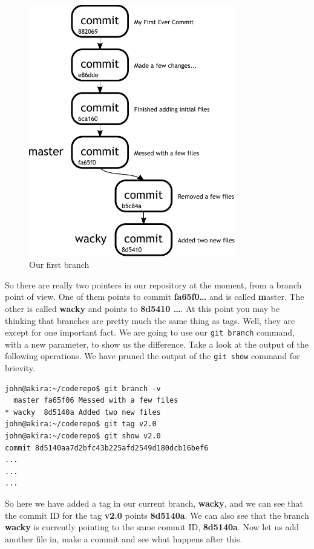 \begin{figure}[hbt]
\centering
\includegraphics[width=9cm]{images/f-w4-d1.pdf}
\caption{Our first branch}
\end{figure}

So there are really two pointers in our repository at the moment, from a branch point of view.  One of them points to commit \textbf{fa65f0\ldots} and is called \textbf master.  The other is called \textbf{wacky} and points to \textbf{8d5410
\ldots}.  At this point you may be thinking that branches are pretty much the same thing as tags.  Well, they are except for one important fact.  We are going to use our \texttt{git branch} command, with a new parameter, to show us the difference.  Take a look at the output of the following operations.  We have pruned the output of the \texttt{git show} command for brievity.

\begin{Verbatim}[frame=leftline,framerule=1mm,fontsize=\relsize{-3}] 
john@akira:~/coderepo$ git branch -v
  master fa65f06 Messed with a few files
* wacky  8d5140a Added two new files
john@akira:~/coderepo$ git tag v2.0
john@akira:~/coderepo$ git show v2.0
commit 8d5140aa7d2bfc43b225afd2549d180dcb16bef6
...
...
...
\end{Verbatim}

So here we have added a tag in our current branch, \textbf{wacky}, and we can see that the commit ID for the tag \textbf{v2.0} points \textbf{8d5140a}.  We can also see that the branch \textbf{wacky} is currently pointing to the same commit ID, \textbf{8d5140a}.  Now let us add another file in, make a commit and see what happens after this.

